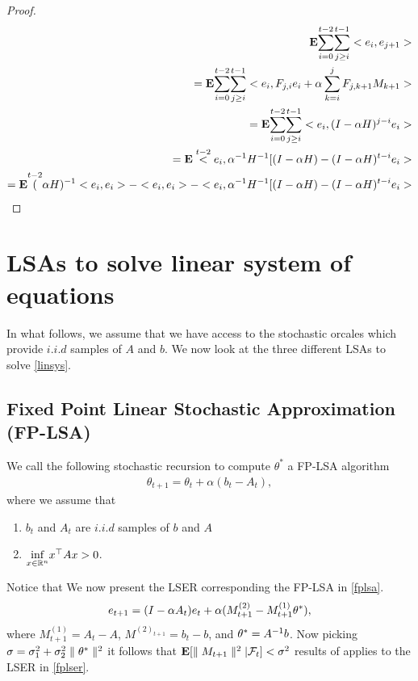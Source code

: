 \begin{proof}
{\begin{align*}
\mathbf{E}\overset{t-2}{\underset{i=0}{\sum}}\overset{t-1}{\underset{j\geq i}{\sum}} <e_i,e_{j+1}>\nonumber\\
=\mathbf{E}\overset{t-2}{\underset{i=0}{\sum}}\overset{t-1}{\underset{j\geq i}{\sum}} <e_i,F_{j,i}e_i + \alpha\sum_{k=i}^{j} F_{j,k+1}M_{k+1}>\nonumber\\
=\mathbf{E}\overset{t-2}{\underset{i=0}{\sum}}\overset{t-1}{\underset{j\geq i}{\sum}} <e_i,(I-\alpha H)^{j-i}e_i >\nonumber\\
=\mathbf{E}\overset{t-2} <e_i,\alpha^{-1}H^{-1}[(I-\alpha H)-(I-\alpha H)^{t-i}e_i >\nonumber\\
=\mathbf{E}\overset{t-2} (\alpha H)^{-1}<e_i,e_i > - <e_i,e_i >- <e_i,\alpha^{-1}H^{-1}[(I-\alpha H)-(I-\alpha H)^{t-i}e_i >\nonumber\\
\end{align*}
}
\end{proof}
\section{LSAs to solve linear system of equations}
In what follows, we assume that we have access to the stochastic orcales which provide $i.i.d$ samples of $A$ and $b$. We now look at the three different LSAs to solve \eqref{linsys}.
\subsection{Fixed Point Linear Stochastic Approximation (FP-LSA)}
We call the following stochastic recursion to compute $\theta^*$ a FP-LSA algorithm
\begin{align}\label{fplsa}
\theta_{t+1}=\theta_t+\alpha(b_t-A_t),
\end{align}
where we assume that
\begin{assumption}
\begin{enumerate}[leftmargin=*]
\item $b_t$ and $A_t$ are $i.i.d$ samples of $b$ and $A$
\item \label{pd}$\underset{x\in\mathbb{R}^n}{\inf} x^\top A x>0$.
\end{enumerate}
\end{assumption}
Notice that
We now present the LSER corresponding the FP-LSA in \eqref{fplsa}.
\begin{align}\label{fplser}
e_{t+1}=(I-\alpha A_t)e_t+\alpha(M^{(2)}_{t+1}-M^{(1)}_{t+1}\theta^*),
\end{align}
where $M^{(1)}_{t+1}=A_t-A$, $M^{(2)_{t+1}}=b_t-b$,  and $\theta^*=A^{-1}b$. Now picking $\sigma=\sigma_1^2+\sigma^2_2 \parallel\theta^*\parallel^2$ it follows that $\mathbf{E}[\parallel M_{t+1} \parallel^2|\mathcal{F}_t]<\sigma^2$ results of  applies to the LSER in \eqref{fplser}.

